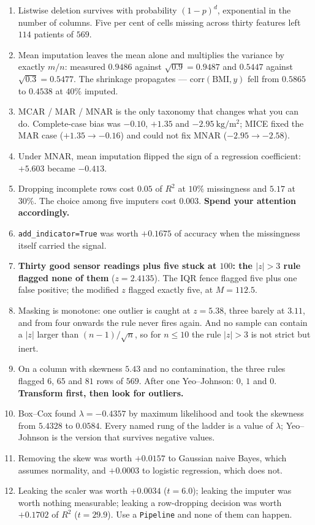 \documentclass[11pt]{article}
\begin{document}
\begin{enumerate}[leftmargin=*]
  \item Listwise deletion survives with probability $(1-p)^d$, exponential in
    the number of columns. Five per cent of cells missing across thirty
    features left $114$ patients of $569$.
  \item Mean imputation leaves the mean alone and multiplies the variance by
    exactly $m/n$: measured $0.9486$ against $\sqrt{0.9} = 0.9487$ and $0.5447$
    against $\sqrt{0.3} = 0.5477$. The shrinkage propagates ---
    $\mathrm{corr}(\mathrm{BMI}, y)$ fell from $0.5865$ to $0.4538$ at $40\%$
    imputed.
  \item MCAR / MAR / MNAR is the only taxonomy that changes what you can do.
    Complete-case bias was $-0.10$, $+1.35$ and $-2.95\ \mathrm{kg/m^2}$;
    MICE fixed the MAR case ($+1.35 \to -0.16$) and could not fix MNAR
    ($-2.95 \to -2.58$).
  \item Under MNAR, mean imputation flipped the sign of a regression
    coefficient: $+5.603$ became $-0.413$.
  \item Dropping incomplete rows cost $0.05$ of $R^2$ at $10\%$ missingness
    and $5.17$ at $30\%$. The choice among five imputers cost $0.003$.
    \textbf{Spend your attention accordingly.}
  \item \texttt{add\_indicator=True} was worth $+0.1675$ of accuracy when the
    missingness itself carried the signal.
  \item \textbf{Thirty good sensor readings plus five stuck at $100$: the
    $|z|>3$ rule flagged none of them} ($z = 2.4135$). The IQR fence flagged
    five plus one false positive; the modified $z$ flagged exactly five, at
    $M = 112.5$.
  \item Masking is monotone: one outlier is caught at $z = 5.38$, three barely
    at $3.11$, and from four onwards the rule never fires again. And no sample
    can contain a $|z|$ larger than $(n-1)/\sqrt n$, so for $n \le 10$ the rule
    $|z| > 3$ is not strict but inert.
  \item On a column with skewness $5.43$ and no contamination, the three rules
    flagged $6$, $65$ and $81$ rows of $569$. After one Yeo--Johnson: $0$, $1$
    and $0$. \textbf{Transform first, then look for outliers.}
  \item Box--Cox found $\lambda = -0.4357$ by maximum likelihood and took the
    skewness from $5.4328$ to $0.0584$. Every named rung of the ladder is a
    value of $\lambda$; Yeo--Johnson is the version that survives negative
    values.
  \item Removing the skew was worth $+0.0157$ to Gaussian naive Bayes, which
    assumes normality, and $+0.0003$ to logistic regression, which does not.
  \item Leaking the scaler was worth $+0.0034$ ($t = 6.0$); leaking the imputer
    was worth nothing measurable; leaking a row-dropping decision was worth
    $+0.1702$ of $R^2$ ($t = 29.9$). Use a \texttt{Pipeline} and none of them
    can happen.
\end{enumerate}
\end{document}
